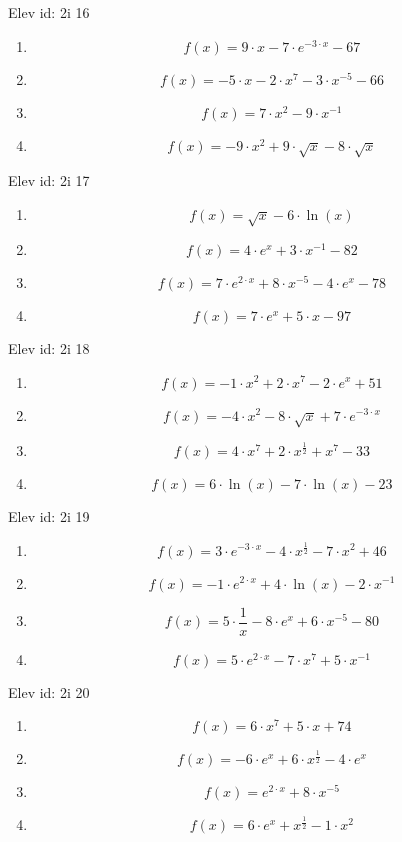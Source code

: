 \item Elev id: 2i 16
\begin{enumerate}
\item 
$$
f(x)=9\cdot x-7\cdot e^{-3\cdot x}-67
$$
\item 
$$
f(x)=-5\cdot x-2\cdot x^7-3\cdot x^{-5}-66
$$
\item 
$$
f(x)=7\cdot x^2-9\cdot x^{-1}
$$
\item 
$$
f(x)=-9\cdot x^2+9\cdot \sqrt{x}-8\cdot \sqrt{x}
$$
\end{enumerate}
\item Elev id: 2i 17
\begin{enumerate}
\item 
$$
f(x)=\sqrt{x}-6\cdot \ln(x)
$$
\item 
$$
f(x)=4\cdot e^x+3\cdot x^{-1}-82
$$
\item 
$$
f(x)=7\cdot e^{2\cdot x}+8\cdot x^{-5}-4\cdot e^x-78
$$
\item 
$$
f(x)=7\cdot e^x+5\cdot x-97
$$
\end{enumerate}
\item Elev id: 2i 18
\begin{enumerate}
\item 
$$
f(x)=-1\cdot x^2+2\cdot x^7-2\cdot e^x+51
$$
\item 
$$
f(x)=-4\cdot x^2-8\cdot \sqrt{x}+7\cdot e^{-3\cdot x}
$$
\item 
$$
f(x)=4\cdot x^7+2\cdot x^{\frac{1}{2}}+x^7-33
$$
\item 
$$
f(x)=6\cdot \ln(x)-7\cdot \ln(x)-23
$$
\end{enumerate}
\item Elev id: 2i 19
\begin{enumerate}
\item 
$$
f(x)=3\cdot e^{-3\cdot x}-4\cdot x^{\frac{1}{2}}-7\cdot x^2+46
$$
\item 
$$
f(x)=-1\cdot e^{2\cdot x}+4\cdot \ln(x)-2\cdot x^{-1}
$$
\item 
$$
f(x)=5\cdot \frac{1}{x}-8\cdot e^x+6\cdot x^{-5}-80
$$
\item 
$$
f(x)=5\cdot e^{2\cdot x}-7\cdot x^7+5\cdot x^{-1}
$$
\end{enumerate}
\item Elev id: 2i 20
\begin{enumerate}
\item 
$$
f(x)=6\cdot x^7+5\cdot x+74
$$
\item 
$$
f(x)=-6\cdot e^x+6\cdot x^{\frac{1}{2}}-4\cdot e^x
$$
\item 
$$
f(x)=e^{2\cdot x}+8\cdot x^{-5}
$$
\item 
$$
f(x)=6\cdot e^x+x^{\frac{1}{2}}-1\cdot x^2
$$
\end{enumerate}
